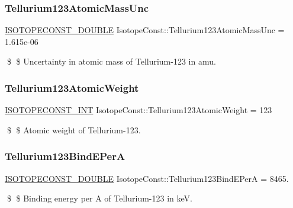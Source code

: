 \subsubsection{\texorpdfstring{Tellurium123\+Atomic\+Mass\+Unc}{Tellurium123AtomicMassUnc}}
{\footnotesize\ttfamily \mbox{\hyperlink{group___isotope_const-_macros_ga8f45a7272ce02c0b4c65c44636ed719a}{I\+S\+O\+T\+O\+P\+E\+C\+O\+N\+S\+T\+\_\+\+D\+O\+U\+B\+LE}} Isotope\+Const\+::\+Tellurium123\+Atomic\+Mass\+Unc = 1.\+615e-\/06}

\$ \$ Uncertainty in atomic mass of Tellurium-\/123 in amu. \mbox{\label{group___isotope_const-_tellurium-_te123_gaca5386f057b089c1cf2a6a89e54232de}} 
\subsubsection{\texorpdfstring{Tellurium123\+Atomic\+Weight}{Tellurium123AtomicWeight}}
{\footnotesize\ttfamily \mbox{\hyperlink{group___isotope_const-_macros_ga5f18360b3e99483a35c32d789e62621c}{I\+S\+O\+T\+O\+P\+E\+C\+O\+N\+S\+T\+\_\+\+I\+NT}} Isotope\+Const\+::\+Tellurium123\+Atomic\+Weight = 123}

\$ \$ Atomic weight of Tellurium-\/123. \mbox{\label{group___isotope_const-_tellurium-_te123_gaafe421f124d0e73f889d80a27ed448cc}} 
\subsubsection{\texorpdfstring{Tellurium123\+Bind\+E\+PerA}{Tellurium123BindEPerA}}
{\footnotesize\ttfamily \mbox{\hyperlink{group___isotope_const-_macros_ga8f45a7272ce02c0b4c65c44636ed719a}{I\+S\+O\+T\+O\+P\+E\+C\+O\+N\+S\+T\+\_\+\+D\+O\+U\+B\+LE}} Isotope\+Const\+::\+Tellurium123\+Bind\+E\+PerA = 8465.}

\$ \$ Binding energy per A of Tellurium-\/123 in keV. \mbox{\label{group___isotope_const-_tellurium-_te123_gad9ba126730f02181c74e6d2f80781d1f}} 
